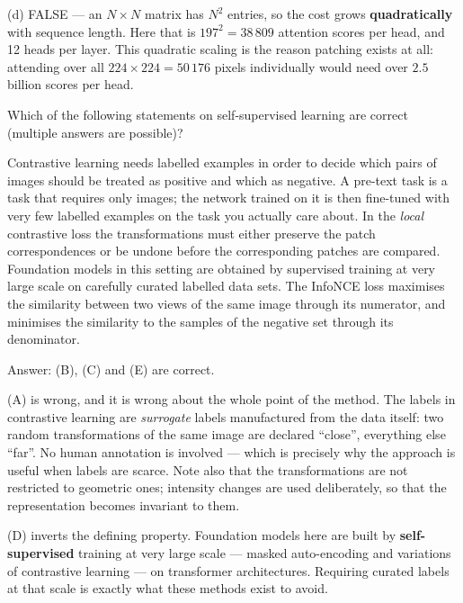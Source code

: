 \documentclass[11pt]{exam}
\begin{document}
\begin{questions}
\begin{solution}
  (d) FALSE --- an $N \times N$ matrix has $N^2$ entries, so the cost grows \textbf{quadratically}
  with sequence length. Here that is $197^2 = 38\,809$ attention scores per head, and 12 heads per
  layer. This quadratic scaling is the reason patching exists at all: attending over all
  $224 \times 224 = 50\,176$ pixels individually would need over $2.5$ billion scores per head.
\end{solution}

\question
Which of the following statements on self-supervised learning are correct (multiple answers are
possible)?

\begin{choices}
  \choice Contrastive learning needs labelled examples in order to decide which pairs of images
  should be treated as positive and which as negative.
  \choice A pre-text task is a task that requires only images; the network trained on it is then
  fine-tuned with very few labelled examples on the task you actually care about.
  \choice In the \emph{local} contrastive loss the transformations must either preserve the patch
  correspondences or be undone before the corresponding patches are compared.
  \choice Foundation models in this setting are obtained by supervised training at very large scale
  on carefully curated labelled data sets.
  \choice The InfoNCE loss maximises the similarity between two views of the same image through its
  numerator, and minimises the similarity to the samples of the negative set through its
  denominator.
\end{choices}

\begin{solution}
  Answer: (B), (C) and (E) are correct.

  (A) is wrong, and it is wrong about the whole point of the method. The labels in contrastive
  learning are \emph{surrogate} labels manufactured from the data itself: two random transformations
  of the same image are declared ``close'', everything else ``far''. No human annotation is involved
  --- which is precisely why the approach is useful when labels are scarce. Note also that the
  transformations are not restricted to geometric ones; intensity changes are used deliberately, so
  that the representation becomes invariant to them.

  (D) inverts the defining property. Foundation models here are built by \textbf{self-supervised}
  training at very large scale --- masked auto-encoding and variations of contrastive learning ---
  on transformer architectures. Requiring curated labels at that scale is exactly what these methods
  exist to avoid.
\end{solution}

\end{questions}
\end{document}
